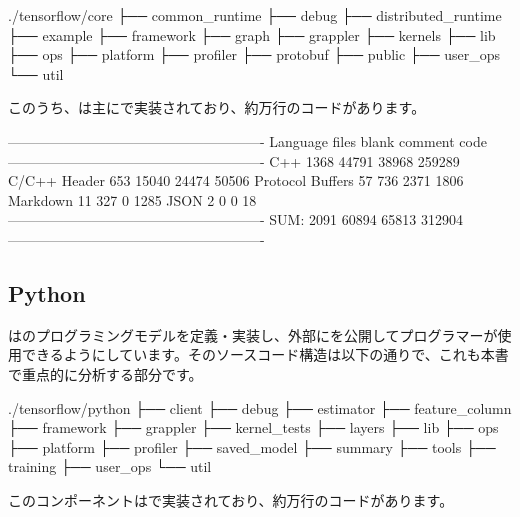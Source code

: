 \begin{content}
\begin{leftbar}
\begin{c++}[caption={Coreソースコード構造}]
./tensorflow/core
├── common_runtime
├── debug
├── distributed_runtime
├── example
├── framework
├── graph
├── grappler
├── kernels
├── lib
├── ops
├── platform
├── profiler
├── protobuf
├── public
├── user_ops
└── util
\end{c++}
\end{leftbar}

このうち、は主にで実装されており、約万行のコードがあります。

\begin{leftbar}
\begin{python}[caption={Coreコード統計}]
-------------------------------------------------------
Language             files    blank   comment      code
-------------------------------------------------------
C++                   1368    44791     38968    259289
C/C++ Header           653    15040     24474     50506
Protocol Buffers        57      736      2371      1806
Markdown                11      327         0      1285
JSON                     2        0         0        18
-------------------------------------------------------
SUM:                  2091    60894     65813    312904
-------------------------------------------------------
\end{python}
\end{leftbar}

\subsection{Python}

は\tf{}のプログラミングモデルを定義・実装し、外部にを公開してプログラマーが使用できるようにしています。そのソースコード構造は以下の通りで、これも本書で重点的に分析する部分です。

\begin{leftbar}
\begin{c++}[caption={Pythonソースコード構造}]
./tensorflow/python
├── client
├── debug
├── estimator
├── feature_column
├── framework
├── grappler
├── kernel_tests
├── layers
├── lib
├── ops
├── platform
├── profiler
├── saved_model
├── summary
├── tools
├── training
├── user_ops
└── util
\end{c++}
\end{leftbar}

このコンポーネントはで実装されており、約万行のコードがあります。


\end{content}
